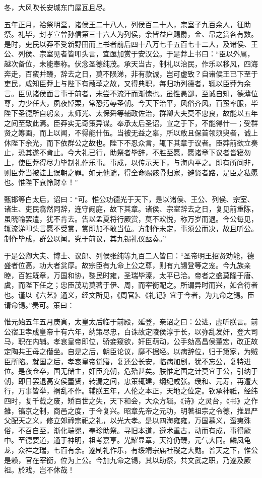 \documentclass[]{article}
\begin{document}
冬，大风吹长安城东门屋瓦且尽。

五年正月，袷祭明堂，诸侯王二十八人，列侯百二十人，宗室子九百余人，征助祭。礼毕，封孝宣曾孙信第三十六人为列侯，余皆益户赐爵，金、帛之赏各有数。是时，吏民以莽不受新野田而上书者前后四十八万七千五百七十二人，及诸侯、王公、列侯、宗室见者皆叩头言，宜亟加赏于安汉公。于是莽上书曰：``臣以外属，越次备位，未能奉称。伏念圣德纯茂。承天当古，制礼以治民，作乐以移风，四海奔走，百蛮并臻，辞去之日，莫不陨涕，非有款诚，岂可虚致？自诸侯王已下至于吏民，咸知臣莽上与陛下有葭莩之故，又得典职，每归功列德者，辄以臣莽为余言。臣见诸侯面言事于前者，未尝不流汗而渐愧也。虽性愚鄙，至诚自知，德薄位尊，力少任大，夙夜悼栗，常恐污辱圣朝。今天下治平，风俗齐风，百蛮率服，毕陛下圣德所自躬亲，太师光、太保舜等辅政佐治，群卿大夫莫不忠良，故能以五年之间至致此焉。臣莽实无奇策异谋。奉承太后圣诏，宣之于下，不能得什一；受群贤之筹画，而上以闻，不得能什伍。当被无益之辜，所以敢且保首领须臾者，诚上休陛下余光，而下依群公之故也。陛下不忍众言，辄下其章于议者。臣莽前欲立奏止，恐其遂不肯止。今大礼已行，助祭者毕辞，不胜至愿，愿诸章下议者皆寝勿上，使臣莽得尽力毕制礼作乐事。事成，以传示天下，与海内平之。即有所间非，则臣莽当被诖上误朝之罪。如无他谴，得全命赐骸骨归家，避贤者路，是臣之私愿也。惟陛下哀怜财幸！''

甄邯等白太后，诏曰：``可。惟公功德光于天下，是以诸侯、王公、列侯、宗室、诸生、吏民翕然同辞，连守阙庭，故下其章。诸侯、宗室辞去之日，复见前重陈，虽晓喻罢遣，犹不肯去。告以孟夏将行厥赏，莫不欢悦，称万岁而退。今公每见，辄流涕叩头言愿不受赏，赏即加不敢当位。方制作未定，事须公而决，故且听公。制作毕成，群公以闻。究于前议，其九锡礼仪亟奏。''

于是公卿大夫、博士、议郎、列侯张纯等九百二人皆曰：``圣帝明王招贤劝能，德盛者位高，功大者赏厚。故宗臣有九命上公之尊，则有九锡登等之宠。今九族亲睦，百姓既章，万国和协，黎民时雍，圣瑞毕溱，太平已洽。帝者之盛莫隆于唐、虞，而陛下任之；忠臣茂功莫著于伊、周，而宰衡配之。所谓异时而兴，如合符者也。谨以《六艺》通义，经文所见，《周官》、《礼记》宜于今者，为九命之锡。臣请命锡。''奏可。策曰：

惟元始五年五月庚寅，太皇太后临于前殿，延登，亲诏之曰：公进，虚听朕言。前公宿卫孝成皇帝十有六年，纳策尽忠，白诛故定陵侯淳于长，以弥乱发奸，登大司马，职在内辅。孝哀皇帝即位，骄妾窥欲，奸臣萌动，公手劾高昌侯董宏，改正故定陶共王母之僣坐。自是之后，朝臣论议，靡不据经。以病辞位，归于第家，为贼臣所陷。就国之后，孝哀皇帝觉寤，复还公长安，临病加剧，犹不忘公，复特进位。是夜仓卒，国无储主，奸臣充朝，危殆甚矣。朕惟定国之计莫宜于公，引纳于朝，即日罢退高安侯董贤，转漏之间，忠策辄建，纲纪咸张。绶和、元寿，再遭大行，万事皆举，祸乱不作。辅朕五年，人伦之本正，天地之位定。钦承神祇，经纬四时，复千载之废，矫百世之失，天下和会，大众方辑。《诗》之灵台，《书》之作雒，镐京之制，商邑之度，于今复兴。昭章先帝之元功，明著祖宗之令德，推显严父配天之义，修立郊禘宗祀之礼，以光大孝。是以四海雍雍，万国慕义，蛮夷殊俗，不召自至，渐化端冕，奉珍助祭。寻旧本道，遵术重古，动而有成，事得厥中。至德要道，通于神明，祖考嘉享。光耀显章，天符仍臻，元气大同。麟凤龟龙，众祥之瑞，七百有余。遂制礼作乐，有绥靖宗庙社稷之大勋。普天之下，惟公是赖，官在宰衡，位为上公。今加九命之锡，其以助祭，共文武之职，乃遂及厥祖。於戏，岂不休哉！
\end{document}
